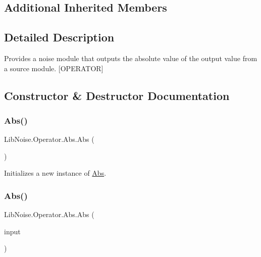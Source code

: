 \subsection*{Additional Inherited Members}


\subsection{Detailed Description}
Provides a noise module that outputs the absolute value of the output value from a source module. \mbox{[}O\+P\+E\+R\+A\+T\+OR\mbox{]} 



\subsection{Constructor \& Destructor Documentation}
\mbox{\label{class_lib_noise_1_1_operator_1_1_abs_a3db6904f2e7b23215c83bffe4429c47d}} 
\subsubsection{\texorpdfstring{Abs()}{Abs()}\hspace{0.1cm}{\footnotesize\ttfamily [1/2]}}
{\footnotesize\ttfamily Lib\+Noise.\+Operator.\+Abs.\+Abs (\begin{DoxyParamCaption}{ }\end{DoxyParamCaption})}



Initializes a new instance of \hyperlink{class_lib_noise_1_1_operator_1_1_abs}{Abs}. 

\mbox{\label{class_lib_noise_1_1_operator_1_1_abs_ad3431fe63d7758693a4b1d92baf0e0ea}} 
\subsubsection{\texorpdfstring{Abs()}{Abs()}\hspace{0.1cm}{\footnotesize\ttfamily [2/2]}}
{\footnotesize\ttfamily Lib\+Noise.\+Operator.\+Abs.\+Abs (\begin{DoxyParamCaption}\item[{\hyperlink{class_lib_noise_1_1_module_base}{Module\+Base}}]{input }\end{DoxyParamCaption})}



